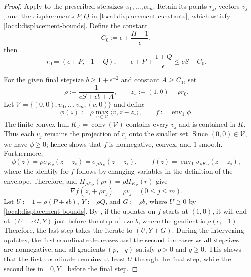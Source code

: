 \documentclass[11pt,letterpaper]{article}
\theoremstyle{definition}
\begin{document}
\begin{proof}
Apply  to the prescribed stepsizes $\alpha_1,\ldots,\alpha_m$.
Retain its points $r_j$, vectors $v_j$, and the displacements $P,Q$ in \eqref{local:displacement-constants}, which satisfy \eqref{local:displacement-bounds}.
Define the constant
\begin{equation*}
    C_0:=\epsilon+\frac{H+1}{\epsilon},
\end{equation*}
then 
\begin{equation}\label{eq:cSplusC0}
    r_0=(\epsilon+P,-1-Q),\qquad
  \epsilon+P+\frac{1+Q}{\epsilon}\le cS+C_0.
\end{equation}

For the given final stepsize $b\ge1+\epsilon^{-2}$ and constant $A\ge C_0$, set
\begin{equation*}
  \rho:=\frac1{cS+\epsilon b+A},\qquad
  z_\circ:=(1,0)-\rho r_0.
\end{equation*}
Let $\mathcal V=\{(0,0),v_0,\ldots,v_m,(c,0)\}$ and define
\begin{equation}
  \phi(z):=\rho\max_{v\in\mathcal V}\langle v,z-z_\circ\rangle,
  \qquad f:=\operatorname{env}_1\phi.
  \label{local:finite-envelope}
\end{equation}
The finite convex hull $K_{\mathcal V}=\operatorname{conv}(\mathcal V)$ contains every $v_j$ and is contained in $K$.
Thus each $v_j$ remains the projection of $r_j$ onto the smaller set.
Since $(0,0)\in\mathcal V$, we have $\phi\ge0$; hence  shows that $f$ is nonnegative, convex, and $1$-smooth.
Furthermore,
\[
  \phi(z)=\rho\sigma_{K_{\mathcal V}}(z-z_\circ)
  =\sigma_{\rho K_{\mathcal V}}(z-z_\circ),
  \qquad
  f(z)=\operatorname{env}_1\sigma_{\rho K_{\mathcal V}}(z-z_\circ),
\]
where the identity for $f$ follows by changing variables in the definition of
the envelope.  Therefore,  and
$\Pi_{\rho K_{\mathcal V}}(\rho r)=\rho\Pi_{K_{\mathcal V}}(r)$ give
\begin{equation}
  \nabla f(z_\circ+\rho r_j)=\rho v_j\quad(0\le j\le m).
  \label{local:scaled-gradients}
\end{equation}
Let $U:=1-\rho(P+\epsilon b)$, $Y:=\rho Q$, and $G:=\rho b$, where $U\geq 0$ by \eqref{local:displacement-bounds}.
By , if the updates on $f$ starts at $(1,0)$, it will end at $(U+\epsilon G,Y)$ just before the step of size $b$, where the gradient is $\rho(\epsilon,-1)$.
Therefore, the last step takes the iterate to $(U,Y+G)$.
During the intervening updates, the first coordinate decreases and the second increases as all stepsizes are nonnegative, and all gradients $(p,-q)$ satisfy $p>0$ and $q\ge0$.
This shows that the first coordinate remains at least $U$ through the final step, while the second lies in $[0,Y]$ before the final step.



\end{proof}
\end{document}
